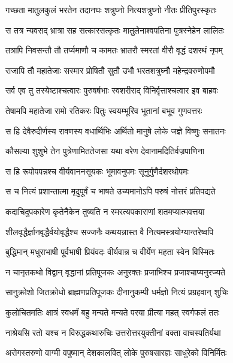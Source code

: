 
\twolineshloka
{गच्छता मातुलकुलं भरतेन तदानघः}
{शत्रुघ्नो नित्यशत्रुघ्नो नीतः प्रीतिपुरस्कृतः} %

\twolineshloka
{स तत्र न्यवसद् भ्रात्रा सह सत्कारसत्कृतः}
{मातुलेनाश्वपतिना पुत्रस्नेहेन लालितः} %

\twolineshloka
{तत्रापि निवसन्तौ तौ तर्प्यमाणौ च कामतः}
{भ्रातरौ स्मरतां वीरौ वृद्धं दशरथं नृपम्} %

\twolineshloka
{राजापि तौ महातेजाः सस्मार प्रोषितौ सुतौ}
{उभौ भरतशत्रुघ्नौ महेन्द्रवरुणोपमौ} %

\twolineshloka
{सर्व एव तु तस्येष्टाश्चत्वारः पुरुषर्षभाः}
{स्वशरीराद् विनिर्वृत्ताश्चत्वार इव बाहवः} %

\twolineshloka
{तेषामपि महातेजा रामो रतिकरः पितुः}
{स्वयम्भूरिव भूतानां बभूव गुणवत्तरः} %

\twolineshloka
{स हि देवैरुदीर्णस्य रावणस्य वधार्थिभिः}
{अर्थितो मानुषे लोके जज्ञे विष्णुः सनातनः} %

\twolineshloka
{कौसल्या शुशुभे तेन पुत्रेणामिततेजसा}
{यथा वरेण देवानामदितिर्वज्रपाणिना} %

\twolineshloka
{स हि रूपोपपन्नश्च वीर्यवाननसूयकः}
{भूमावनुपमः सूनुर्गुणैर्दशरथोपमः} %

\twolineshloka
{स च नित्यं प्रशान्तात्मा मृदुपूर्वं च भाषते}
{उच्यमानोऽपि परुषं नोत्तरं प्रतिपद्यते} %

\twolineshloka
{कदाचिदुपकारेण कृतेनैकेन तुष्यति}
{न स्मरत्यपकाराणां शतमप्यात्मवत्तया} %

\twolineshloka
{शीलवृद्धैर्ज्ञानवृद्धैर्वयोवृद्धैश्च सज्जनैः}
{कथयन्नास्त वै नित्यमस्त्रयोग्यान्तरेष्वपि} %

\twolineshloka
{बुद्धिमान् मधुराभाषी पूर्वभाषी प्रियंवदः}
{वीर्यवान्न च वीर्येण महता स्वेन विस्मितः} %

\twolineshloka
{न चानृतकथो विद्वान् वृद्धानां प्रतिपूजकः}
{अनुरक्तः प्रजाभिश्च प्रजाश्चाप्यनुरज्यते} %

\twolineshloka
{सानुक्रोशो जितक्रोधो ब्राह्मणप्रतिपूजकः}
{दीनानुकम्पी धर्मज्ञो नित्यं प्रग्रहवान् शुचिः} %

\twolineshloka
{कुलोचितमतिः क्षात्रं स्वधर्मं बहु मन्यते}
{मन्यते परया प्रीत्या महत् स्वर्गफलं ततः} %

\twolineshloka
{नाश्रेयसि रतो यश्च न विरुद्धकथारुचिः}
{उत्तरोत्तरयुक्तीनां वक्ता वाचस्पतिर्यथा} %

\twolineshloka
{अरोगस्तरुणो वाग्मी वपुष्मान् देशकालवित्}
{लोके पुरुषसारज्ञः साधुरेको विनिर्मितः} %

